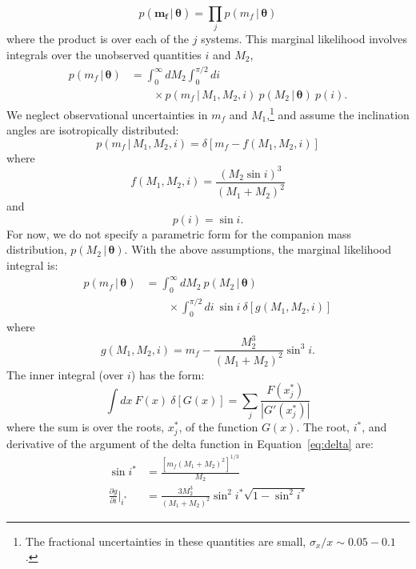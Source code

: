 \documentclass[apjl]{emulateapj}
\newcommand{\given}{\,|\,}
\newcommand{\bs}[1]{\boldsymbol{#1}}
\newcommand{\eqn}{Equation~}
\newcommand{\mf}{m_f}
\begin{document}
\begin{equation}
p(\bs{\mf} \given \bs{\theta}) = \prod_j p(\mf \given \bs{\theta})
\end{equation}
where the product is over each of the $j$ systems.  This marginal likelihood involves integrals over the unobserved quantities $i$ and $M_2$,
\begin{align}
    p(\mf \given \bs{\theta}) &= \int_0^\infty dM_2 \int_0^{\pi/2} di  \nonumber \\
      & \qquad {} \times p(\mf \given M_1, M_2, i)~p(M_2 \given \bs{\theta})~p(i).
\end{align}
We neglect observational uncertainties in $\mf$ and $M_1$,\footnote{The fractional uncertainties in these quantities are small, $\sigma_x / x \sim 0.05-0.1$ \citep{gianninas14}.} and assume the inclination angles are isotropically distributed:
\begin{equation}
	p(\mf \given M_1, M_2, i) = \delta \left[\mf - f(M_1, M_2, i) \right]
\end{equation}
where
\begin{equation}
	f(M_1, M_2, i) = \frac{(M_2 \sin i)^3}{(M_1 + M_2)^2}
\end{equation}
and
\begin{equation}
	p(i) = \sin i.
\end{equation}
For now, we do not specify a parametric form for the companion mass distribution, $p(M_2 \given \bs{\theta})$. With the above assumptions, the marginal likelihood integral is:
\begin{align}
    p(\mf \given \bs{\theta}) &= \int_{0}^\infty dM_2 ~p(M_2 \given \bs{\theta})  \nonumber \\
    & \qquad {} \times \int_0^{\pi/2} di ~\sin i ~ \delta \left[g(M_1,M_2,i) \right]\label{eq:delta}
\end{align}
where
\begin{equation}
	g(M_1,M_2,i) = \mf - \frac{M_2^3}{(M_1+M_2)^2}\sin^3 i.
\end{equation}
The inner integral (over $i$) has the form:
\begin{equation}
    \int dx~F(x)~\delta \left[ G(x) \right] = \sum_j \frac{F(x^*_j)}{|G'(x^*_j)|}
\end{equation}
where the sum is over the roots, $x^*_j$, of the function $G(x)$. The root, $i^*$, and derivative of the argument of the delta function in \eqn\ref{eq:delta} are: 
\begin{align}
	\sin i^* &= \frac{ \left[\mf(M_1+M_2)^2 \right]^{1/3}}{M_2}\\
	\frac{\partial g}{\partial i}\bigg\rvert_{i^*} &= \frac{3M_2^3}{(M_1+M_2)^2} \sin^2 i^* \sqrt{1 - \sin^2 i^*}
\end{align}
\end{document}
